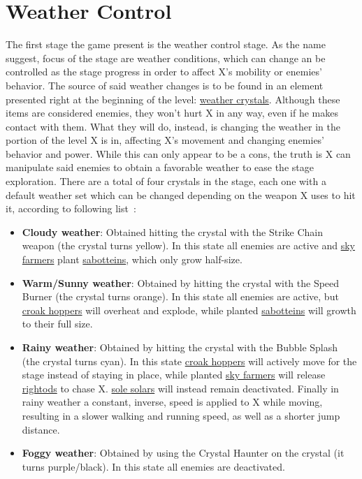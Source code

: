 \section{Weather Control}
The first stage the game present is the weather control stage. As the name suggest, focus of the stage are weather conditions, which can change an be controlled as the stage progress in order to affect X's mobility or enemies' behavior. The source of said weather changes is to be found in an element presented right at the beginning of the level: \hyperlink{enem:Weather_crystal}{weather crystals}. Although these items are considered enemies, they won't hurt X in any way, even if he makes contact with them. What they will do, instead, is changing the weather in the portion of the level X is in, affecting X's movement and changing enemies' behavior and power. While this can only appear to be a cons, the truth is X can manipulate said enemies to obtain a favorable weather to ease the stage exploration. There are a total of four crystals in the stage, each one with a default weather set which can be changed depending on the weapon X uses to hit it, according to following list~\cite{wiki:Weather_crystal}:
\begin{itemize}
	\item \textbf{Cloudy weather}: Obtained hitting the crystal with the Strike Chain weapon (the crystal turns yellow). In this state all enemies are active and \hyperlink{enem:Sky_farmer}{sky farmers} plant \hyperlink{enem:Sabottein}{sabotteins}, which only grow half-size.
	\item \textbf{Warm/Sunny weather}: Obtained by hitting the crystal with the Speed Burner (the crystal turns orange). In this state all enemies are active, but \hyperlink{enem:Croak_hopper}{croak hoppers} will overheat and explode, while planted \hyperlink{enem:Sabottein}{sabotteins} will growth to their full size.
	\item \textbf{Rainy weather}: Obtained by hitting the crystal with the Bubble Splash (the crystal turns cyan). In this state \hyperlink{enem:Croak_hopper}{croak hoppers} will actively move for the stage instead of staying in place, while planted \hyperlink{enem:Sky_farmer}{sky farmers} will release \hyperlink{enem:Rightod}{rightods} to chase X. \hyperlink{enem:Sole_solar}{sole solars} will instead remain deactivated. Finally in rainy weather a constant, inverse, speed is applied to X while moving, resulting in a slower walking and running speed, as well as a shorter jump distance.
	\item \textbf{Foggy weather}: Obtained by using the Crystal Haunter on the crystal (it turns purple/black). In this state all enemies are deactivated.
\end{itemize}

